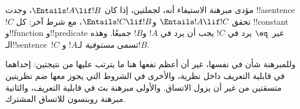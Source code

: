 \documentclass[../../../include/open-logic-section]{subfiles}
\begin{document}


مؤدى مبرهنة الاستيفاء أنه، لجملتين، إذا كان
$\Entails !A \lif !B$، وجدت !!a{sentence}~$!C$ تحقق
$\Entails !A \lif !C$ و$\Entails !C \lif !B$،
مع شرط آخر: كل !!{constant} و!!{function} و!!{predicate}
غير~$\eq$ يرد في $!C$ يجب أن يرد في $!A$ و$!B$
جميعًا. وهذه الـ!!{sentence}~$!C$ تسمى \emph{مستوفية}
لـ$!A$ و$!B$.

وللمبرهنة شأن في نفسها، غير أن أعظم نفعها هنا ما يترتب
عليها من نتيجتين: إحداهما في قابلية التعريف داخل نظرية،
والأخرى في الشروط التي يجوز معها ضم نظريتين متسقتين
من غير أن يزول الاتساق. والأولى مبرهنة بث في قابلية
التعريف، والثانية مبرهنة روبنسون للاتساق المشترك.
\end{document}
